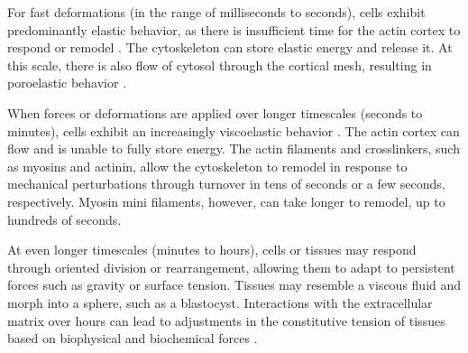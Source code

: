 For fast deformations (in the range of milliseconds to seconds), cells exhibit predominantly elastic behavior, as there is insufficient time for the actin cortex to respond or remodel \cite{deng2006}. The cytoskeleton can store elastic energy and release it. At this scale, there is also flow of cytosol through the cortical mesh, resulting in poroelastic behavior \cite{moeendarbary2013}.

When forces or deformations are applied over longer timescales (seconds to minutes), cells exhibit an increasingly viscoelastic behavior \cite{kollmannsberger2011}. The actin cortex can flow and is unable to fully store energy. The actin filaments and crosslinkers, such as myosins and actinin, allow the cytoskeleton to remodel in response to mechanical perturbations through turnover in tens of seconds or a few seconds, respectively. Myosin mini filaments, however, can take longer to remodel, up to hundreds of seconds.

At even longer timescales (minutes to hours), cells or tissues may respond through oriented division or rearrangement, allowing them to adapt to persistent forces such as gravity or surface tension. Tissues may resemble a viscous fluid and morph into a sphere, such as a blastocyst. Interactions with the extracellular matrix over hours can lead to adjustments in the constitutive tension of tissues based on biophysical and biochemical forces \cite{porazinski2015}.


